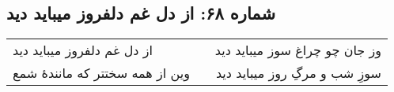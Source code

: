 \begin{center}
\section*{شماره ۶۸: از دل غم دلفروز میباید دید}
\label{sec:068}
\begin{longtable}{l p{0.5cm} r}
از دل غم دلفروز میباید دید
&&
وز جان چو چراغ سوز میباید دید
\\
وین از همه سختتر که مانندهٔ شمع
&&
سوزِ شب و مرگِ روز میباید دید
\\
\end{longtable}
\end{center}
